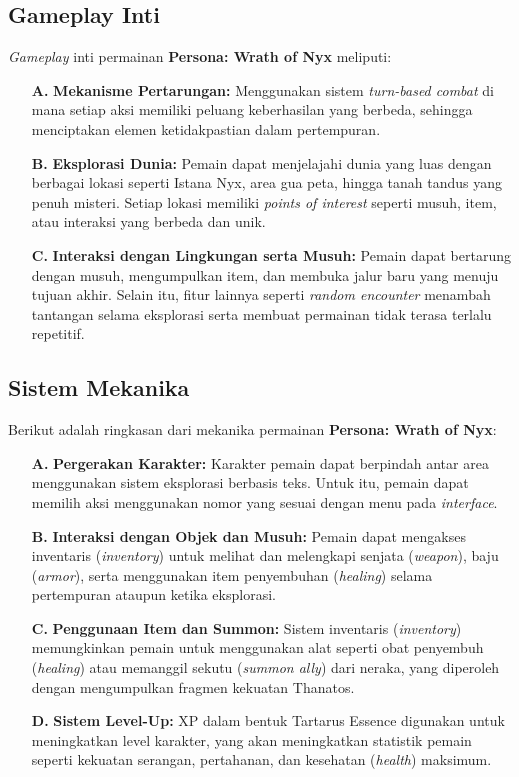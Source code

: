 \documentclass[12pt]{article}
\begin{document}
    \subsection{Gameplay Inti}
        \textit{Gameplay} inti permainan \textbf{Persona: Wrath of Nyx} meliputi:
        \begin{enumerate}
            \item[\textbf{A.}] \textbf{Mekanisme Pertarungan:} Menggunakan sistem \textit{turn-based combat} di mana setiap aksi memiliki peluang keberhasilan yang berbeda, sehingga menciptakan elemen ketidakpastian dalam pertempuran.
            \item[\textbf{B.}] \textbf{Eksplorasi Dunia:} Pemain dapat menjelajahi dunia yang luas dengan berbagai lokasi seperti Istana Nyx, area gua peta, hingga tanah tandus yang penuh misteri. Setiap lokasi memiliki \textit{points of interest} seperti musuh, item, atau interaksi yang berbeda dan unik.
            \item[\textbf{C.}] \textbf{Interaksi dengan Lingkungan serta Musuh:} Pemain dapat bertarung dengan musuh, mengumpulkan item, dan membuka jalur baru yang menuju tujuan akhir. Selain itu, fitur lainnya seperti \textit{random encounter} menambah tantangan selama eksplorasi serta membuat permainan tidak terasa terlalu repetitif.
        \end{enumerate}
    \subsection{Sistem Mekanika}
        Berikut adalah ringkasan dari mekanika permainan \textbf{Persona: Wrath of Nyx}:
        \begin{enumerate}
            \item[\textbf{A.}] \textbf{Pergerakan Karakter:} Karakter pemain dapat berpindah antar area menggunakan sistem eksplorasi berbasis teks. Untuk itu, pemain dapat memilih aksi menggunakan nomor yang sesuai dengan menu pada \textit{interface}.
            \item[\textbf{B.}] \textbf{Interaksi dengan Objek dan Musuh:} Pemain dapat mengakses inventaris (\textit{inventory}) untuk melihat dan melengkapi senjata (\textit{weapon}), baju (\textit{armor}), serta menggunakan item penyembuhan (\textit{healing}) selama pertempuran ataupun ketika eksplorasi.
            \item[\textbf{C.}] \textbf{Penggunaan Item dan Summon:} Sistem inventaris (\textit{inventory}) memungkinkan pemain untuk menggunakan alat seperti obat penyembuh (\textit{healing}) atau memanggil sekutu (\textit{summon ally}) dari neraka, yang diperoleh dengan mengumpulkan fragmen kekuatan Thanatos.
            \item[\textbf{D.}] \textbf{Sistem Level-Up:} XP dalam bentuk Tartarus Essence digunakan untuk meningkatkan level karakter, yang akan meningkatkan statistik pemain seperti kekuatan serangan, pertahanan, dan kesehatan (\textit{health}) maksimum.
        \end{enumerate}
        
\end{document}
